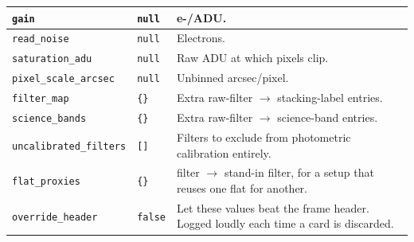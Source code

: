 \documentclass[11pt,a4paper]{article}
\begin{document}
\begin{center}
\begin{tabularx}{\textwidth}{|l|l|X|}
\hline
\texttt{gain} & \texttt{null} & e-/ADU. \\
\hline
\texttt{read\_noise} & \texttt{null} & Electrons. \\
\hline
\texttt{saturation\_adu} & \texttt{null} & Raw ADU at which pixels clip. \\
\hline
\texttt{pixel\_scale\_arcsec} & \texttt{null} & Unbinned arcsec/pixel. \\
\hline
\texttt{filter\_map} & \texttt{\{\}} & Extra raw-filter $\rightarrow$ stacking-label entries. \\
\hline
\texttt{science\_bands} & \texttt{\{\}} & Extra raw-filter $\rightarrow$ science-band entries. \\
\hline
\texttt{uncalibrated\_filters} & \texttt{[]} & Filters to exclude from photometric calibration entirely. \\
\hline
\texttt{flat\_proxies} & \texttt{\{\}} & filter $\rightarrow$ stand-in filter, for a setup that reuses one flat for another. \\
\hline
\texttt{override\_header} & \texttt{false} & Let these values beat the frame header. Logged loudly each time a card is discarded. \\
\hline
\end{tabularx}
\end{center}
\end{document}
